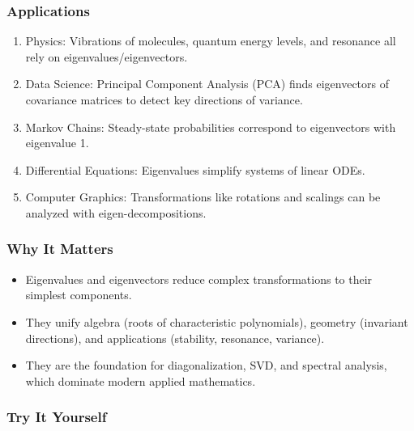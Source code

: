\documentclass[
  letterpaper,
  DIV=11,
  numbers=noendperiod]{scrreprt}
\providecommand{\tightlist}{%
  \setlength{\itemsep}{0pt}\setlength{\parskip}{0pt}}
\begin{document}
\subsubsection{Applications}\label{applications-23}

\begin{enumerate}
\def\labelenumi{\arabic{enumi}.}
\tightlist
\item
  Physics: Vibrations of molecules, quantum energy levels, and resonance
  all rely on eigenvalues/eigenvectors.
\item
  Data Science: Principal Component Analysis (PCA) finds eigenvectors of
  covariance matrices to detect key directions of variance.
\item
  Markov Chains: Steady-state probabilities correspond to eigenvectors
  with eigenvalue 1.
\item
  Differential Equations: Eigenvalues simplify systems of linear ODEs.
\item
  Computer Graphics: Transformations like rotations and scalings can be
  analyzed with eigen-decompositions.
\end{enumerate}

\subsubsection{Why It Matters}\label{why-it-matters-57}

\begin{itemize}
\tightlist
\item
  Eigenvalues and eigenvectors reduce complex transformations to their
  simplest components.
\item
  They unify algebra (roots of characteristic polynomials), geometry
  (invariant directions), and applications (stability, resonance,
  variance).
\item
  They are the foundation for diagonalization, SVD, and spectral
  analysis, which dominate modern applied mathematics.
\end{itemize}

\subsubsection{Try It Yourself}\label{try-it-yourself-60}
\end{document}
